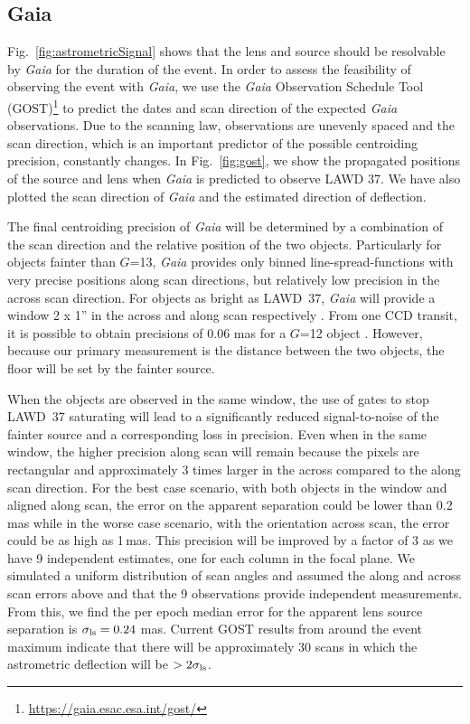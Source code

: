\documentclass[fleqn,usenatbib]{mnras}
\newcommand{\Gaia}{{\it Gaia }}
\begin{document}
\subsection{Gaia}

Fig.~\ref{fig:astrometricSignal} shows that the lens and source should be resolvable by \Gaia for the duration of the event. In order to assess the feasibility of observing the event with {\it Gaia}, we use the \Gaia Observation Schedule Tool (GOST)\footnote{\url{https://gaia.esac.esa.int/gost/}} to predict the dates and scan direction of the expected {\it Gaia} observations. Due to the scanning law, observations are unevenly spaced and the scan direction, which is an important predictor of the possible centroiding precision, constantly changes. In Fig.~\ref{fig:gost}, we show the propagated positions of the source and lens when \Gaia is predicted to observe LAWD 37. We have also plotted the scan direction of \Gaia and the estimated direction of deflection.

The final centroiding precision of \Gaia will be determined by a combination of the scan direction and the relative position of the two objects. Particularly for objects fainter than $G$=13, \Gaia provides only binned line-spread-functions with very precise positions along scan directions, but relatively low precision in the across scan direction. For objects as bright as LAWD~37, \Gaia will provide a window 2 x 1'' in the across and along scan respectively \citep{2016A&A...595A...3F}. From
one CCD transit, it is possible to obtain precisions of 0.06 mas for a $G$=12 object \citep{2016A&A...595A...3F}. However, because our primary measurement is the distance between the two objects, the floor will be set by the fainter source. 

When the objects are observed in the same window, the use of gates to stop LAWD~37 saturating will lead to a significantly reduced signal-to-noise of the fainter source and a corresponding loss in precision.  Even when in the same window, the higher precision along scan will remain because the pixels are rectangular and approximately 3 times larger in the across compared to the along scan direction. For the best case scenario, with both objects in the window and aligned along scan, the error on the apparent separation could be lower than 0.2\,mas while in the worse case scenario, with the orientation across scan, the
error could be as high as 1\,mas. This precision will be improved by a factor of 3 as we have 9 independent estimates, one for each column in the focal plane. We simulated a uniform distribution of scan angles and assumed the along and across scan errors above and that the 9 observations provide independent measurements. From this, we find the per epoch median error for the apparent lens source separation is $\sigma_{\rm ls}=0.24$ mas. Current GOST results from around the event maximum indicate that there will be approximately $30$ scans in which the astrometric deflection will be $> 2 \sigma_{\rm ls}$.
\end{document}
